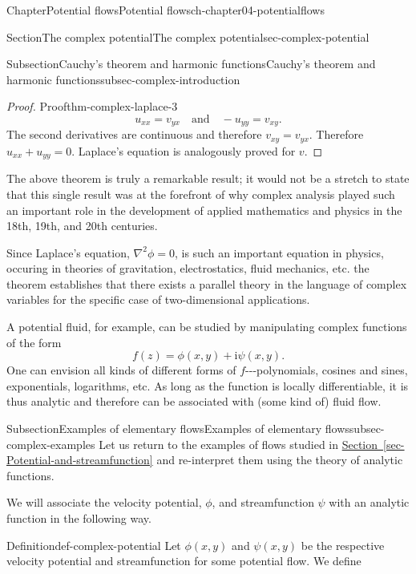 \documentclass[oneside,10pt,]{book}
\newcommand{\xreffont}{\relax}
\numberwithin{equation}{section}
\newcommand{\im}{\mathrm{i}}
\begin{document}
\begin{chapterptx}{Chapter}{Potential flows}{}{Potential flows}{}{}{ch-chapter04-potentialflows}
\begin{sectionptx}{Section}{The complex potential}{}{The complex potential}{}{}{sec-complex-potential}
\begin{subsectionptx}{Subsection}{Cauchy's theorem and harmonic functions}{}{Cauchy's theorem and harmonic functions}{}{}{subsec-complex-introduction}
\begin{proof}{Proof}{}{thm-complex-laplace-3}
\begin{equation*}
u_{xx} = v_{yx} \quad \text{and} \quad -u_{yy} = v_{xy}. 
\end{equation*}
The second derivatives are continuous and therefore \(v_{xy} = v_{yx}\). Therefore \(u_{xx} + u_{yy} = 0\). Laplace's equation is analogously proved for \(v\).%
\end{proof}
The above theorem is truly a remarkable result; it would not be a stretch to state that this single result was at the forefront of why complex analysis played such an important role in the development of applied mathematics and physics in the 18th, 19th, and 20th centuries.%
\par
Since Laplace's equation, \(\nabla^2 \phi = 0\), is such an important equation in physics, occuring in theories of gravitation, electrostatics, fluid mechanics, etc. the theorem establishes that there exists a parallel theory in the language of complex variables for the specific case of two-dimensional applications.%
\par
A potential fluid, for example, can be studied by manipulating complex functions of the form%
\begin{equation*}
f(z) = \phi(x, y) + \im \psi(x, y).
\end{equation*}
One can envision all kinds of different forms of \(f\)-{}-{}-polynomials, cosines and sines, exponentials, logarithms, etc. As long as the function is locally differentiable, it is thus analytic and therefore can be associated with (some kind of) fluid flow.%
\end{subsectionptx}
%
%
\typeout{************************************************}
\typeout{************************************************}
%
\begin{subsectionptx}{Subsection}{Examples of elementary flows}{}{Examples of elementary flows}{}{}{subsec-complex-examples}
Let us return to the examples of flows studied in \hyperref[sec-Potential-and-streamfunction]{Section~{\xreffont\ref{sec-Potential-and-streamfunction}}} and re-interpret them using the theory of analytic functions.%
\par
We will associate the velocity potential, \(\phi\), and streamfunction \(\psi\) with an analytic function in the following way.%
\begin{definition}{Definition}{}{def-complex-potential}%
Let \(\phi(x,y)\) and \(\psi(x, y)\) be the respective velocity potential and streamfunction for some potential flow. We define%
\begin{equation}

\end{equation}
\end{definition}
\end{subsectionptx}
\end{sectionptx}
\end{chapterptx}
\end{document}
